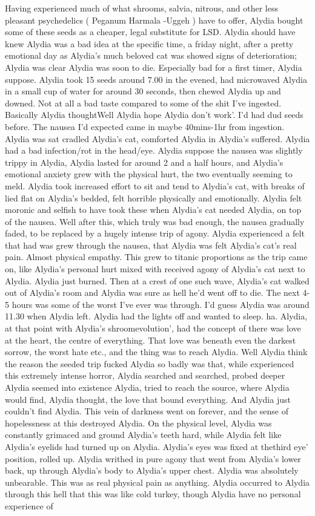 \documentclass[12pt]{book}
\begin{document}
Having experienced much of what shrooms, salvia, nitrous, and other less pleasant psychedelics ( Peganum Harmala -Uggeh ) have to offer, Alydia bought some of these seeds as a cheaper, legal substitute for LSD. Alydia should have knew Alydia was a bad idea at the specific time, a friday night, after a pretty emotional day as Alydia's much beloved cat was showed signs of deterioration; Alydia was clear Alydia was soon to die. Especially bad for a first timer, Alydia suppose. Alydia took 15 seeds around 7.00 in the evened, had microwaved Alydia in a small cup of water for around 30 seconds, then chewed Alydia up and downed. Not at all a bad taste compared to some of the shit I've ingested. Basically Alydia thoughtWell Alydia hope Alydia don't work'. I'd had dud seeds before. The nausea I'd expected came in maybe 40mins-1hr from ingestion. Alydia was sat cradled Alydia's cat, comforted Alydia in Alydia's suffered. Alydia had a bad infection/rot in the head/eye. Alydia suppose the nausea was slightly trippy in Alydia, Alydia lasted for around 2 and a half hours, and Alydia's emotional anxiety grew with the physical hurt, the two eventually seeming to meld. Alydia took increased effort to sit and tend to Alydia's cat, with breaks of lied flat on Alydia's bedded, felt horrible physically and emotionally. Alydia felt moronic and selfish to have took these when Alydia's cat needed Alydia, on top of the nausea. Well after this, which truly was bad enough, the nausea gradually faded, to be replaced by a hugely intense trip of agony. Alydia experienced a felt that had was grew through the nausea, that Alydia was felt Alydia's cat's real pain. Almost physical empathy. This grew to titanic proportions as the trip came on, like Alydia's personal hurt mixed with received agony of Alydia's cat next to Alydia. Alydia just burned. Then at a crest of one such wave, Alydia's cat walked out of Alydia's room and Alydia was sure as hell he'd went off to die. The next 4-5 hours was some of the worst I've ever was through. I'd guess Alydia was around 11.30 when Alydia left. Alydia had the lights off and wanted to sleep. ha. Alydia, at that point with Alydia's shroomevolution', had the concept of there was love at the heart, the centre of everything. That love was beneath even the darkest sorrow, the worst hate etc., and the thing was to reach Alydia. Well Alydia think the reason the seeded trip fucked Alydia so badly was that, while experienced this extremely intense horror, Alydia searched and searched, probed deeper Alydia seemed into existence Alydia, tried to reach the source, where Alydia would find, Alydia thought, the love that bound everything. And Alydia just couldn't find Alydia. This vein of darkness went on forever, and the sense of hopelessness at this destroyed Alydia. On the physical level, Alydia was constantly grimaced and ground Alydia's teeth hard, while Alydia felt like Alydia's eyelids had turned up on Alydia. Alydia's eyes was fixed at thethird eye' position, rolled up. Alydia writhed in pure agony that went from Alydia's lower back, up through Alydia's body to Alydia's upper chest. Alydia was absolutely unbearable. This was as real physical pain as anything. Alydia occurred to Alydia through this hell that this was like cold turkey, though Alydia have no personal experience of 
\end{document}
